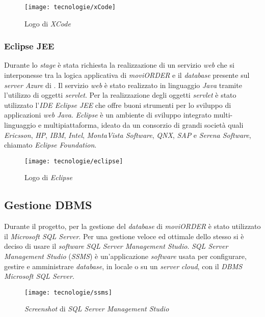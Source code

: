 \begin{figure}[!h] 
    \centering 
    \texttt{[image: tecnologie/xCode]} 
    \caption{Logo di \textit{XCode}}
\end{figure}

\subsubsection{Eclipse JEE}

Durante lo \textit{stage} è stata richiesta la realizzazione di un servizio \textit{web} che si interponesse tra la logica applicativa di \textit{moviORDER} e il \textit{database} presente sul \textit{server Azure} di \visione{}. Il servizio \textit{web} è stato realizzato in linguaggio \textit{Java} tramite l'utilizzo di oggetti \textit{servlet}. Per la realizzazione degli oggetti \textit{servlet} è stato utilizzato l'\textit{IDE Eclipse JEE} che offre buoni strumenti per lo sviluppo di applicazioni \textit{web} \textit{Java}. \textit{Eclipse} è un ambiente di sviluppo integrato multi-linguaggio e multipiattaforma, ideato da un consorzio di grandi società quali \textit{Ericsson}, \textit{HP}, \textit{IBM}, \textit{Intel}, \textit{MontaVista Software}, \textit{QNX}, \textit{SAP} e \textit{Serena Software}, chiamato \textit{Eclipse Foundation}.

\begin{figure}[!h] 
    \centering 
    \texttt{[image: tecnologie/eclipse]} 
    \caption{Logo di \textit{Eclipse}}
\end{figure}

\subsection{Gestione DBMS}

Durante il progetto, per la gestione del \textit{database} di \textit{moviORDER} è stato utilizzato il  \textit{Microsoft SQL Server}. Per una gestione veloce ed ottimale dello stesso si è deciso di usare il \textit{software} \textit{SQL Server Management Studio}. \textit{SQL Server Management Studio} (\textit{SSMS}) è un'applicazione \textit{software} usata per configurare, gestire e amministrare \textit{database}, in locale o su un \textit{server} \textit{cloud}, con il \textit{DBMS Microsoft SQL Server}. 

\begin{figure}[!h] 
    \centering 
    \texttt{[image: tecnologie/ssms]} 
    \caption{\textit{Screenshot} di \textit{SQL Server Management Studio}}
\end{figure}

